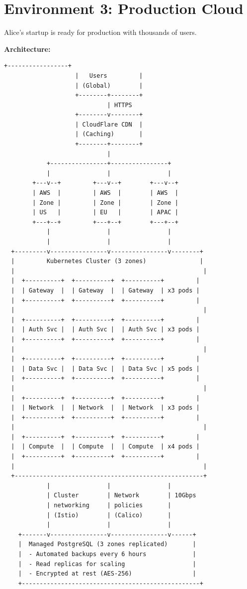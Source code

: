 \documentclass[11pt,a4paper]{report}
\begin{document}
\section{Environment 3: Production Cloud}


Alice's startup is ready for production with thousands of users.

\textbf{Architecture:}
\begin{lstlisting}[language=text]
                    +-----------------+
                    |   Users         |
                    | (Global)        |
                    +--------+--------+
                             | HTTPS
                    +--------v--------+
                    | CloudFlare CDN  |
                    | (Caching)       |
                    +--------+--------+
                             |
            +----------------+----------------+
            |                |                |
        +---v--+         +---v--+        +---v--+
        | AWS  |         | AWS  |        | AWS  |
        | Zone |         | Zone |        | Zone |
        | US   |         | EU   |        | APAC |
        +---+--+         +---+--+        +---+--+
            |                |                |
            |                |                |
  +---------v----------------v----------------v--------+
  |         Kubernetes Cluster (3 zones)               |
  |                                                     |
  |  +----------+  +----------+  +----------+         |
  |  | Gateway  |  | Gateway  |  | Gateway  | x3 pods |
  |  +----------+  +----------+  +----------+         |
  |                                                     |
  |  +----------+  +----------+  +----------+         |
  |  | Auth Svc |  | Auth Svc |  | Auth Svc | x3 pods |
  |  +----------+  +----------+  +----------+         |
  |                                                     |
  |  +----------+  +----------+  +----------+         |
  |  | Data Svc |  | Data Svc |  | Data Svc | x5 pods |
  |  +----------+  +----------+  +----------+         |
  |                                                     |
  |  +----------+  +----------+  +----------+         |
  |  | Network  |  | Network  |  | Network  | x3 pods |
  |  +----------+  +----------+  +----------+         |
  |                                                     |
  |  +----------+  +----------+  +----------+         |
  |  | Compute  |  | Compute  |  | Compute  | x4 pods |
  |  +----------+  +----------+  +----------+         |
  |                                                     |
  +-----------------------------------------------------+
            |                |                |
            | Cluster        | Network        | 10Gbps
            | networking     | policies       |
            | (Istio)        | (Calico)       |
            |                |                |
    +-------v----------------v----------------v------+
    |  Managed PostgreSQL (3 zones replicated)       |
    |  - Automated backups every 6 hours             |
    |  - Read replicas for scaling                   |
    |  - Encrypted at rest (AES-256)                 |
    +--------------------------------------------------+
    

\end{lstlisting}
\end{document}
